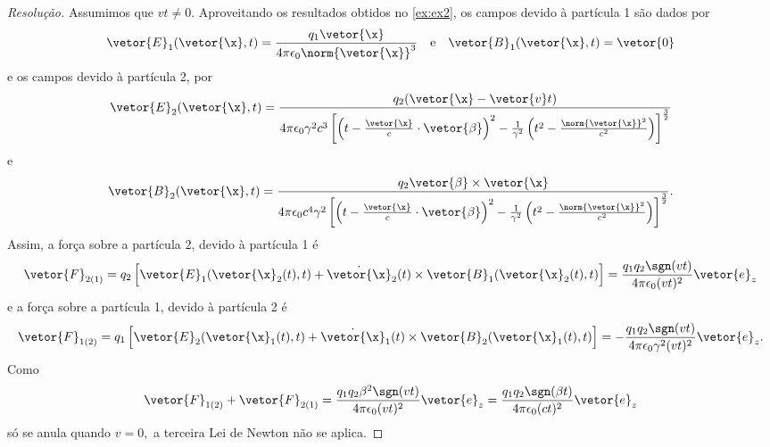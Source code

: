 \begin{proof}[Resolução]
   Assumimos que \(vt \neq 0\). Aproveitando os resultados obtidos no \cref{ex:ex2}, os campos devido à partícula 1 são dados por
   \begin{equation*}
      \vetor{E}_1(\vetor{\x}, t) = \frac{q_1 \vetor{\x}}{4\pi \epsilon_0 \norm{\vetor{\x}}^3} 
      \quad\text{e}\quad
      \vetor{B}_1(\vetor{\x}, t) = \vetor{0}
   \end{equation*}
   e os campos devido à partícula 2, por
   \begin{equation*}
      \vetor{E}_2(\vetor{\x},t) = \frac{q_2 (\vetor{\x} - \vetor{v}t)}{4\pi \epsilon_0\gamma^2c^3 \left[\left(t - \frac{\vetor{\x}}{c} \cdot \vetor{\beta}\right)^2 - \frac1{\gamma^2} \left(t^2 - \frac{\norm{\vetor{\x}}^2}{c^2}\right)\right]^{\frac32}}
   \end{equation*}
   e
   \begin{equation*}
      \vetor{B}_2(\vetor{\x}, t) = \frac{q_2 \vetor{\beta} \times \vetor{\x}}{4\pi \epsilon_0 c^4 \gamma^2 \left[\left(t - \frac{\vetor{\x}}{c} \cdot \vetor{\beta}\right)^2 - \frac{1}{\gamma^2} \left(t^2 - \frac{\norm{\vetor{\x}}^2}{c^2}\right)\right]^{\frac32}}.
   \end{equation*}
   Assim, a força sobre a partícula 2, devido à partícula 1 é
   \begin{equation*}
      \vetor{F}_{2(1)} = q_2 \left[\vetor{E}_1(\vetor{\x}_2(t), t) + \dot{\vetor{\x}}_2(t) \times \vetor{B}_1(\vetor{\x}_2(t), t)\right] = \frac{q_1 q_2 \sgn(v t)}{4\pi \epsilon_0 (vt)^2}\vetor{e}_z
   \end{equation*}
   e a força sobre a partícula 1, devido à partícula 2 é
   \begin{equation*}
      \vetor{F}_{1(2)} = q_1 \left[\vetor{E}_2(\vetor{\x}_1(t), t) + \dot{\vetor{\x}}_1(t) \times \vetor{B}_2(\vetor{\x}_1(t), t)\right] = -\frac{q_1 q_2\sgn(vt)}{4\pi \epsilon_0 \gamma^2 (v t)^2} \vetor{e}_z.
   \end{equation*}
   Como
   \begin{equation*}
      \vetor{F}_{1(2)} + \vetor{F}_{2(1)} = \frac{q_1 q_2 \beta^2\sgn(vt)}{4 \pi \epsilon_0 (vt)^2}\vetor{e}_z = \frac{q_1 q_2 \sgn(\beta t)}{4\pi \epsilon_0 (ct)^2} \vetor{e}_z
   \end{equation*}
   só se anula quando \(v = 0,\) a terceira Lei de Newton não se aplica.


\end{proof}
